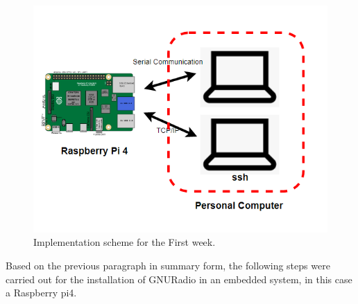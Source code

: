 \documentclass[12pt, twoside]{report}
\begin{document}
\begin{figure}[!h]
\centering
  \includegraphics[scale=0.7]{images/scheme1a.png}
  \caption{Implementation scheme for the First week.}
  \label{fig:scheme1}
\end{figure}

Based on the previous paragraph in summary form, the following steps were carried out for the installation of GNURadio in an embedded system, in this case a Raspberry pi4.
\end{document}

